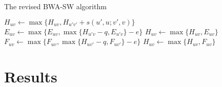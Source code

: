 \documentclass[webpdf,contemporary,large,namedate]{oup-authoring-template}%
\begin{document}
\begin{algorithm}
	\caption{The revised BWA-SW algorithm}\label{algo:bwa-sw}
	\begin{algorithmic}[1]
							\State $H_{uv}\gets \max\{H_{uv},H_{u'v'}+s(u',u;v',v)\}$
						\EndFor
					\EndFor
						\State $E_{uv}\gets\max\{E_{uv},\max\{H_{u'v}-q,E_{u'v}\}-e\}$
						\State $H_{uv}\gets\max\{H_{uv},E_{uv}\}$
					\EndFor
				\EndFor
						\State $F_{uv}\gets\max\{F_{uv},\max\{H_{uv'}-q,F_{uv'}\}-e\}$
						\State $H_{uv}\gets\max\{H_{uv},F_{uv}\}$
					\EndFor
				\EndFor
			\EndFor
		\EndProcedure
	\end{algorithmic}
\end{algorithm}

\section{Results}

\end{document}
